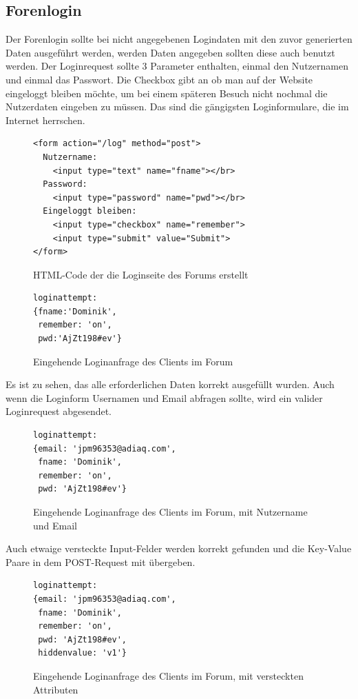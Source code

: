 \subsection{Forenlogin}
Der Forenlogin sollte bei nicht angegebenen Logindaten mit den zuvor generierten Daten ausgeführt werden, werden Daten angegeben sollten diese auch benutzt werden. Der Loginrequest sollte 3 Parameter enthalten, einmal den Nutzernamen und einmal das Passwort. Die Checkbox gibt an ob man auf der Website eingeloggt bleiben möchte, um bei einem späteren Besuch nicht nochmal die Nutzerdaten eingeben zu müssen. Das sind die gängigsten Loginformulare, die im Internet herrschen.

\begin{figure}[ht]
\begin{lstlisting}[language=HTML5]
<form action="/log" method="post">
  Nutzername: 
    <input type="text" name="fname"></br>
  Password: 
    <input type="password" name="pwd"></br>
  Eingeloggt bleiben: 
    <input type="checkbox" name="remember">
    <input type="submit" value="Submit">
</form>
\end{lstlisting}
\caption{HTML-Code der die Loginseite des Forums erstellt}
\end{figure}

\begin{figure}[ht]
\begin{lstlisting}[language=HTML5]
loginattempt: 
{fname:'Dominik',
 remember: 'on',
 pwd:'AjZt198#ev'}
\end{lstlisting}
\caption{Eingehende Loginanfrage des Clients im Forum}
\end{figure}

Es ist zu sehen, das alle erforderlichen Daten korrekt ausgefüllt wurden. Auch wenn die Loginform Usernamen und Email abfragen sollte, wird ein valider Loginrequest abgesendet.

\begin{figure}[ht]
\begin{lstlisting}[language=HTML5]
loginattempt:
{email: 'jpm96353@adiaq.com',
 fname: 'Dominik',
 remember: 'on',
 pwd: 'AjZt198#ev'}
\end{lstlisting}
\caption{Eingehende Loginanfrage des Clients im Forum, mit Nutzername und Email}
\end{figure}

Auch etwaige versteckte Input-Felder werden korrekt gefunden und die Key-Value Paare in dem POST-Request mit übergeben.

\begin{figure}[ht]
\begin{lstlisting}[language=HTML5]
loginattempt:
{email: 'jpm96353@adiaq.com',
 fname: 'Dominik',
 remember: 'on',
 pwd: 'AjZt198#ev',
 hiddenvalue: 'v1'}
\end{lstlisting}
\caption{Eingehende Loginanfrage des Clients im Forum, mit versteckten Attributen}
\end{figure}

